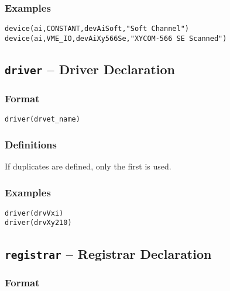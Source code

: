 \subsubsection{Examples}

\begin{lstlisting}[language=dbd]
device(ai,CONSTANT,devAiSoft,"Soft Channel")
device(ai,VME_IO,devAiXy566Se,"XYCOM-566 SE Scanned")
\end{lstlisting}

\subsection{\texttt{driver} -- Driver Declaration}

\subsubsection{Format}

\begin{lstlisting}[language=dbd]
driver(drvet_name)
\end{lstlisting}

\subsubsection{Definitions}

\begin{description}
\item [drvet\_name] If duplicates are defined, only the first is used.

\end{description}

\subsubsection{Examples}

\begin{lstlisting}[language=dbd]
driver(drvVxi)
driver(drvXy210)
\end{lstlisting}

\subsection{\texttt{registrar} -- Registrar Declaration}

\subsubsection{Format}


